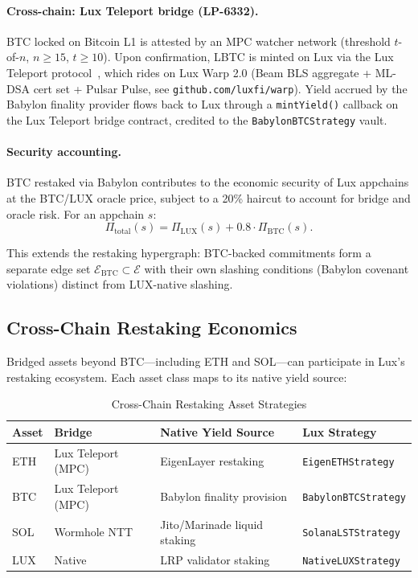 \paragraph{Cross-chain: Lux Teleport bridge (LP-6332).}
BTC locked on Bitcoin L1 is attested by an MPC watcher network (threshold $t$-of-$n$,
$n \geq 15$, $t \geq 10$).  Upon confirmation, LBTC is minted on Lux via the Lux Teleport
protocol~\cite{lux2025teleporter}, which rides on Lux Warp 2.0 (Beam BLS aggregate +
ML-DSA cert set + Pulsar Pulse, see \texttt{github.com/luxfi/warp}).  Yield accrued by
the Babylon finality provider flows back to Lux through a \texttt{mintYield()} callback
on the Lux Teleport bridge contract, credited to the \texttt{BabylonBTCStrategy} vault.

\paragraph{Security accounting.}
BTC restaked via Babylon contributes to the economic security of Lux appchains at the
BTC/LUX oracle price, subject to a 20\% haircut to account for bridge and oracle risk.
For an appchain $s$:
\[
  \Pi_{\text{total}}(s) = \Pi_{\text{LUX}}(s) + 0.8 \cdot \Pi_{\text{BTC}}(s).
\]

This extends the restaking hypergraph: BTC-backed commitments form a separate edge set
$\mathcal{E}_{\text{BTC}} \subset \mathcal{E}$ with their own slashing conditions
(Babylon covenant violations) distinct from LUX-native slashing.

\subsection{Cross-Chain Restaking Economics}
\label{sec:crosschain}

Bridged assets beyond BTC---including ETH and SOL---can participate in Lux's restaking
ecosystem.  Each asset class maps to its native yield source:

\begin{table}[H]
\centering
\caption{Cross-Chain Restaking Asset Strategies}
\label{tab:crosschain}
\begin{tabular}{llll}
\toprule
\textbf{Asset} & \textbf{Bridge} & \textbf{Native Yield Source} & \textbf{Lux Strategy} \\
\midrule
ETH   & Lux Teleport (MPC) & EigenLayer restaking & \texttt{EigenETHStrategy} \\
BTC   & Lux Teleport (MPC) & Babylon finality provision & \texttt{BabylonBTCStrategy} \\
SOL   & Wormhole NTT     & Jito/Marinade liquid staking & \texttt{SolanaLSTStrategy} \\
LUX   & Native           & LRP validator staking & \texttt{NativeLUXStrategy} \\
\bottomrule
\end{tabular}
\end{table}

